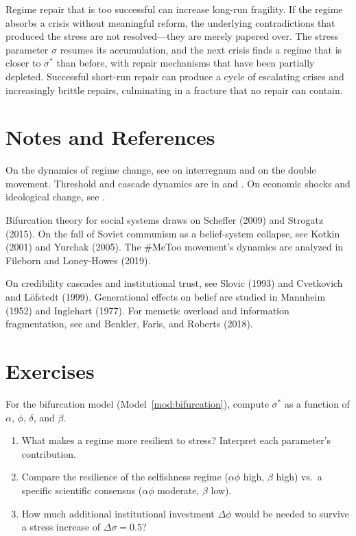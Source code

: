 \begin{proposition}
\label{prop:resilience-paradox}
Regime repair that is too successful can increase long-run fragility.
If the regime absorbs a crisis without meaningful reform, the underlying contradictions that produced the stress are not resolved---they are merely papered over.
The stress parameter $\sigma$ resumes its accumulation, and the next crisis finds a regime that is closer to $\sigma^*$ than before, with repair mechanisms that have been partially depleted.
Successful short-run repair can produce a cycle of escalating crises and increasingly brittle repairs, culminating in a fracture that no repair can contain.
\end{proposition}

\section{Notes and References}
\label{sec:ch30-notes}

On the dynamics of regime change, see \textcite{gramsci1971} on interregnum and \textcite{polanyi1944} on the double movement.
Threshold and cascade dynamics are in \textcite{granovetter1978} and \textcite{watts2002}.
On economic shocks and ideological change, see \textcite{klein2007}.

Bifurcation theory for social systems draws on Scheffer (2009) and Strogatz (2015).
On the fall of Soviet communism as a belief-system collapse, see Kotkin (2001) and Yurchak (2005).
The \#MeToo movement's dynamics are analyzed in Fileborn and Loney-Howes (2019).

On credibility cascades and institutional trust, see Slovic (1993) and Cvetkovich and L\"{o}fstedt (1999).
Generational effects on belief are studied in Mannheim (1952) and Inglehart (1977).
For memetic overload and information fragmentation, see \textcite{sunstein2017} and Benkler, Faris, and Roberts (2018).

\section{Exercises}

\begin{exercise}
For the bifurcation model (Model~\ref{mod:bifurcation}), compute $\sigma^*$ as a function of $\alpha$, $\phi$, $\delta$, and $\beta$.
\begin{enumerate}[nosep]
  \item What makes a regime more resilient to stress? Interpret each parameter's contribution.
  \item Compare the resilience of the selfishness regime ($\alpha\phi$ high, $\beta$ high) vs.\ a specific scientific consensus ($\alpha\phi$ moderate, $\beta$ low).
  \item How much additional institutional investment $\Delta\phi$ would be needed to survive a stress increase of $\Delta\sigma = 0.5$?
\end{enumerate}
\end{exercise}

